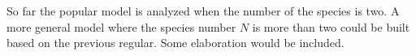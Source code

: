So far the popular model is analyzed when the number of the species is two. A more general model where the species number $N$ is more than two could be built based on the previous regular. Some elaboration would be included.